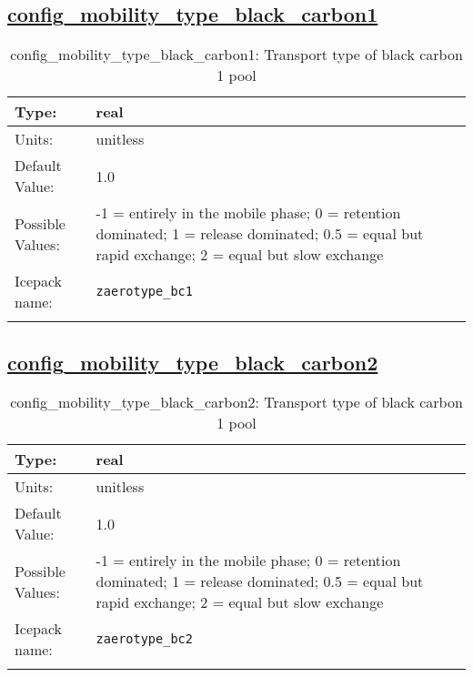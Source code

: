 \subsection[config\_mobility\_type\_black\_carbon1]{\hyperref[sec:nm_tab_biogeochemistry]{config\_mobility\_type\_black\_carbon1}}
\label{subsec:nm_sec_config_mobility_type_black_carbon1}
\begin{center}
\begin{longtable}{| p{2.0in} || p{4.0in} |}
    \hline
    Type: & real \\
    \hline
    Units: & \si{unitless} \\
    \hline
    Default Value: & 1.0 \\
    \hline
    Possible Values: & -1 = entirely in the mobile phase; 0 = retention dominated; 1 = release dominated; 0.5 = equal but rapid exchange; 2 = equal but slow exchange \\
    \hline
    \hline
    Icepack name: & \verb+zaerotype_bc1+ \\
    \caption{config\_mobility\_type\_black\_carbon1: Transport type of black carbon 1 pool}
\end{longtable}
\end{center}
\subsection[config\_mobility\_type\_black\_carbon2]{\hyperref[sec:nm_tab_biogeochemistry]{config\_mobility\_type\_black\_carbon2}}
\label{subsec:nm_sec_config_mobility_type_black_carbon2}
\begin{center}
\begin{longtable}{| p{2.0in} || p{4.0in} |}
    \hline
    Type: & real \\
    \hline
    Units: & \si{unitless} \\
    \hline
    Default Value: & 1.0 \\
    \hline
    Possible Values: & -1 = entirely in the mobile phase; 0 = retention dominated; 1 = release dominated; 0.5 = equal but rapid exchange; 2 = equal but slow exchange \\
    \hline
    \hline
    Icepack name: & \verb+zaerotype_bc2+ \\
    \caption{config\_mobility\_type\_black\_carbon2: Transport type of black carbon 1 pool}
\end{longtable}
\end{center}
